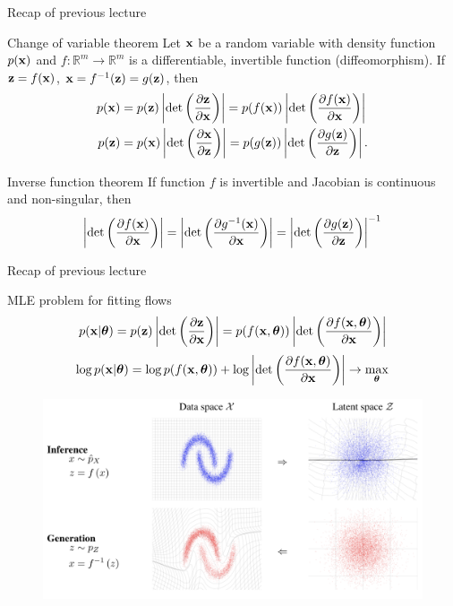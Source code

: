 \begin{frame}{Recap of previous lecture}
	\begin{block}{Change of variable theorem}
		Let $\mathbf{x}$ be a random variable with density function $p(\mathbf{x})$ and $f: \mathbb{R}^m \rightarrow \mathbb{R}^m$ is a differentiable, invertible function (diffeomorphism). If $\mathbf{z} = f(\mathbf{x})$, $\mathbf{x} = f^{-1}(\mathbf{z}) = g(\mathbf{z})$, then
		\begin{align*}
			p(\mathbf{x}) &= p(\mathbf{z}) \left|\det \left(  \frac{\partial \mathbf{z}}{\partial \mathbf{x}} \right) \right| = p(f(\mathbf{x})) \left|\det \left(  \frac{\partial f(\mathbf{x})}{\partial \mathbf{x}} \right) \right| \\
			p(\mathbf{z}) &= p(\mathbf{x}) \left|\det \left(  \frac{\partial \mathbf{x}}{\partial \mathbf{z}} \right) \right| = p(g(\mathbf{z})) \left|\det \left(  \frac{\partial g(\mathbf{z})}{\partial \mathbf{z}} \right) \right|.
		\end{align*}
		\vspace{-0.5cm}
	\end{block}
	\begin{block}{Inverse function theorem}
		If function $f$ is invertible and Jacobian is continuous and non-singular, then
		\[
			\left|\det \left(  \frac{\partial f(\mathbf{x})}{\partial \mathbf{x}} \right)\right| = \left|\det \left(  \frac{\partial g^{-1}(\mathbf{x})}{\partial \mathbf{x}} \right)\right| = \left|\det \left(  \frac{\partial g(\mathbf{z})}{\partial \mathbf{z}} \right)\right|^{-1}
		\]
	\end{block}
\end{frame}
\begin{frame}{Recap of previous lecture}
	\begin{block}{MLE problem for fitting flows}
		\vspace{-0.3cm}
		\[
			p(\mathbf{x}|\boldsymbol{\theta}) = p(\mathbf{z}) \left|\det \left(  \frac{\partial \mathbf{z}}{\partial \mathbf{x}} \right) \right|  = p(f(\mathbf{x}, \boldsymbol{\theta})) \left|\det \left( \frac{\partial f(\mathbf{x}, \boldsymbol{\theta})}{\partial \mathbf{x}} \right) \right|
		\]
		\[
			\log p(\mathbf{x}|\boldsymbol{\theta}) = \log p(f(\mathbf{x}, \boldsymbol{\theta})) + \log  \left|\det \left( \frac{\partial f(\mathbf{x}, \boldsymbol{\theta})}{\partial \mathbf{x}} \right) \right| \rightarrow \max_{\boldsymbol{\theta}}
		\]
	\end{block}
	\vspace{-0.2cm}
	\begin{figure}
		\includegraphics[width=0.85\linewidth]{figs/flows_how2}
	\end{figure}
\end{frame}
